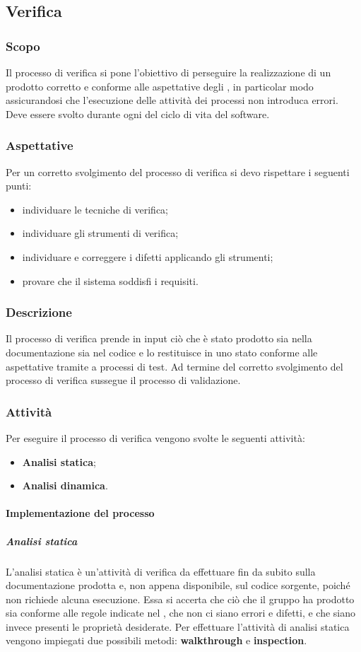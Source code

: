 \subsection{Verifica}
\subsubsection{Scopo}
Il processo di verifica si pone l’obiettivo di perseguire la realizzazione di un prodotto corretto e conforme alle aspettative degli , in particolar modo assicurandosi che l'esecuzione delle attività dei processi non introduca errori.
Deve essere svolto durante ogni  del ciclo di vita del software.
\subsubsection{Aspettative}
Per un corretto svolgimento del processo di verifica si devo rispettare i seguenti punti:
\begin{itemize} 
    \item individuare le tecniche di verifica;
    \item individuare gli strumenti di verifica;
    \item individuare e correggere i difetti applicando gli strumenti;
    \item provare che il sistema soddisfi i requisiti.
\end{itemize}
\subsubsection{Descrizione}
Il processo di verifica prende in input ciò che è stato prodotto sia nella documentazione sia nel codice e lo restituisce in uno stato conforme alle aspettative tramite a processi di test. Ad termine del corretto svolgimento del processo di verifica sussegue il processo di validazione.
\subsubsection{Attività}
Per eseguire il processo di verifica vengono svolte le seguenti attività:
\begin{itemize} 
    \item \textbf{Analisi statica};
    \item \textbf{Analisi dinamica}.
\end{itemize}
\paragraph{Implementazione del processo}
\subparagraph*{Analisi statica} 
L'analisi statica è un'attività di verifica da effettuare fin da subito sulla documentazione prodotta e, non appena disponibile, sul codice sorgente, poiché non richiede alcuna esecuzione.
Essa si accerta che ciò che il gruppo ha prodotto sia conforme alle regole indicate nel \PdQ{}, che non ci siano errori e difetti, e che siano invece presenti le proprietà desiderate.
Per effettuare l’attività di analisi statica vengono impiegati due possibili metodi: \textbf{walkthrough} e \textbf{inspection}.

